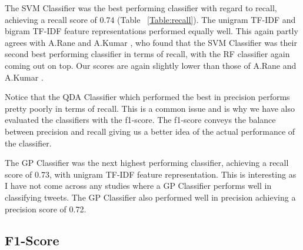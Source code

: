 The SVM Classifier was the best performing classifier with regard to recall, achieving a recall score of 0.74 (Table ~\ref{Table:recall}). The unigram TF-IDF and bigram TF-IDF feature representations performed equally well. This again partly agrees with A.Rane and A.Kumar \cite{Rane2018}, who found that the SVM Classifier was their second best performing classifier in terms of recall, with the RF classifier again coming out on top. Our scores are again slightly lower than those of A.Rane and A.Kumar \cite{Rane2018}.

Notice that the QDA Classifier which performed the best in precision performs pretty poorly in terms of recall. This is a common issue and is why we have also evaluated the classifiers with the f1-score. The f1-score conveys the balance between precision and recall giving us a better idea of the actual performance of the classifier.

The GP Classifier was the next highest performing classifier, achieving a recall score of 0.73, with unigram TF-IDF feature representation. This is interesting as I have not come across any studies where a GP Classifier performs well in classifying tweets. The GP Classifier also performed well in precision achieving a precision score of 0.72.  

\subsection{F1-Score}

